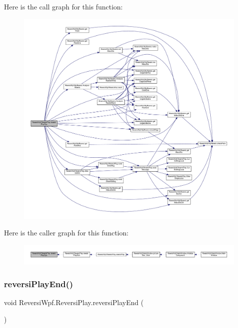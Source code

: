 Here is the call graph for this function\+:\nopagebreak
\begin{figure}[H]
\begin{center}
\leavevmode
\includegraphics[width=350pt]{class_reversi_wpf_1_1_reversi_play_ab9824cdb1bc61ac894ea237b732bd166_cgraph}
\end{center}
\end{figure}
Here is the caller graph for this function\+:\nopagebreak
\begin{figure}[H]
\begin{center}
\leavevmode
\includegraphics[width=350pt]{class_reversi_wpf_1_1_reversi_play_ab9824cdb1bc61ac894ea237b732bd166_icgraph}
\end{center}
\end{figure}
\mbox{\label{class_reversi_wpf_1_1_reversi_play_a091d27bec4b3570ab595a49170342105}} 
\subsubsection{\texorpdfstring{reversi\+Play\+End()}{reversiPlayEnd()}}
{\footnotesize\ttfamily void Reversi\+Wpf.\+Reversi\+Play.\+reversi\+Play\+End (\begin{DoxyParamCaption}{ }\end{DoxyParamCaption})}




